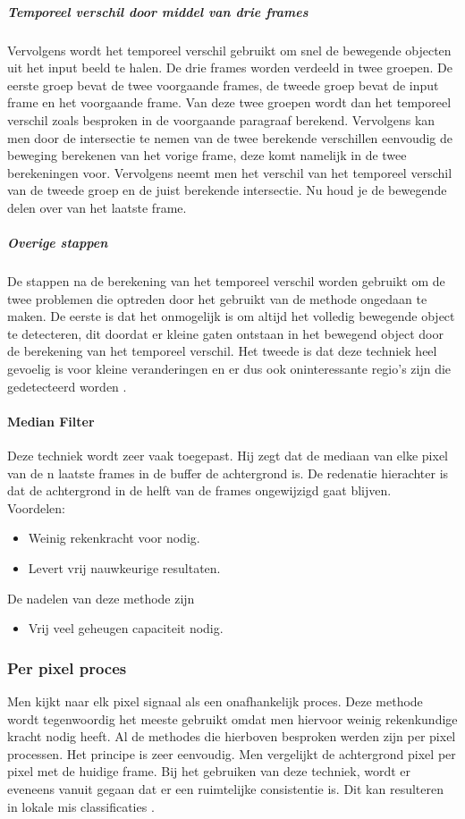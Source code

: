 \subparagraph{Temporeel verschil door middel van drie frames}
Vervolgens wordt het temporeel verschil gebruikt om snel de bewegende objecten uit het input beeld te halen. De drie frames worden verdeeld in twee groepen. De eerste groep bevat de twee voorgaande frames, de tweede groep bevat de input frame en het voorgaande frame. Van deze twee groepen wordt dan het temporeel verschil zoals besproken in de voorgaande paragraaf berekend. Vervolgens kan men door de intersectie te nemen van de twee berekende verschillen eenvoudig de beweging berekenen van het vorige frame, deze komt namelijk in de twee berekeningen voor. Vervolgens neemt men het verschil van het temporeel verschil van de tweede groep en de juist berekende intersectie. Nu houd je de bewegende delen over van het laatste frame.

\subparagraph{Overige stappen}
De stappen na de berekening van het temporeel verschil worden gebruikt om de twee problemen die optreden door het gebruikt van de methode ongedaan te maken. De eerste is dat het onmogelijk is om altijd het volledig bewegende object te detecteren, dit doordat er kleine gaten ontstaan in het bewegend object door de berekening van het temporeel verschil. Het tweede is dat deze techniek heel gevoelig is voor kleine veranderingen en er dus ook oninteressante regio's zijn die gedetecteerd worden \cite{bibTeV}.

\paragraph{Median Filter}
\label{refMEF}
Deze techniek wordt zeer vaak toegepast. Hij zegt dat de mediaan van elke pixel van de n laatste  frames in de buffer de achtergrond is. De redenatie hierachter is dat de achtergrond in de helft van de frames ongewijzigd gaat blijven.\\
Voordelen:
\begin{itemize}
	\item Weinig rekenkracht voor nodig.
	\item Levert vrij nauwkeurige resultaten.
\end{itemize}
De nadelen van deze methode zijn
\begin{itemize}
	\item Vrij veel geheugen capaciteit nodig.
\end{itemize}


\subsubsection{Per pixel proces}
\label{refPPP}
Men kijkt naar elk pixel signaal als een onafhankelijk proces. Deze methode wordt tegenwoordig het meeste gebruikt omdat men hiervoor weinig rekenkundige kracht nodig heeft. Al de methodes die hierboven besproken werden zijn per pixel processen. Het principe is zeer eenvoudig. Men vergelijkt de achtergrond pixel per pixel met de huidige frame. Bij het gebruiken van deze techniek, wordt er eveneens vanuit gegaan dat er een ruimtelijke consistentie is. Dit kan resulteren in lokale mis classificaties \cite{bibBET8}.

